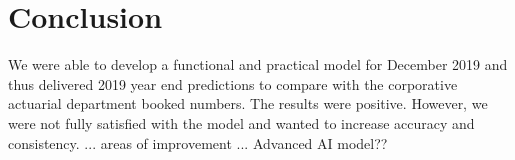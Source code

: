 \section{Conclusion}\label{Sect_Conclusion}
We were able to develop a functional and practical model for December 2019 and thus delivered 2019 year end predictions to compare with the corporative actuarial department booked numbers. The results were positive. However, we were not fully satisfied with the model and wanted to increase accuracy and consistency.  ...
areas of improvement ...
Advanced AI model??